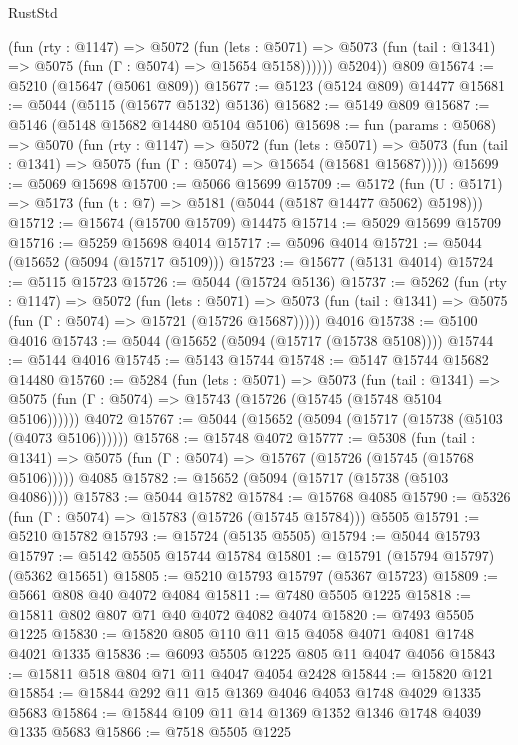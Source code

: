 \begin{lexlean}{RustStd}
\begin{coremodule}
            (fun (rty : @1147) =>
            @5072
              (fun (lets : @5071) =>
              @5073 (fun (tail : @1341) => @5075 (fun (Γ : @5074) => @15654 @5158))))))
        @5204))
    @809
@15674 := @5210 (@15647 (@5061 @809))
@15677 := @5123 (@5124 @809) @14477
@15681 := @5044 (@5115 (@15677 @5132) @5136)
@15682 := @5149 @809
@15687 := @5146 (@5148 @15682 @14480 @5104 @5106)
@15698 := fun (params : @5068) =>
  @5070
    (fun (rty : @1147) =>
    @5072
      (fun (lets : @5071) =>
      @5073 (fun (tail : @1341) => @5075 (fun (Γ : @5074) => @15654 (@15681 @15687)))))
@15699 := @5069 @15698
@15700 := @5066 @15699
@15709 := @5172
    (fun (U : @5171) => @5173 (fun (t : @7) => @5181 (@5044 (@5187 @14477 @5062) @5198)))
@15712 := @15674 (@15700 @15709) @14475
@15714 := @5029 @15699 @15709
@15716 := @5259 @15698 @4014
@15717 := @5096 @4014
@15721 := @5044 (@15652 (@5094 (@15717 @5109)))
@15723 := @15677 (@5131 @4014)
@15724 := @5115 @15723
@15726 := @5044 (@15724 @5136)
@15737 := @5262
    (fun (rty : @1147) =>
    @5072
      (fun (lets : @5071) =>
      @5073 (fun (tail : @1341) => @5075 (fun (Γ : @5074) => @15721 (@15726 @15687)))))
    @4016
@15738 := @5100 @4016
@15743 := @5044 (@15652 (@5094 (@15717 (@15738 @5108))))
@15744 := @5144 @4016
@15745 := @5143 @15744
@15748 := @5147 @15744 @15682 @14480
@15760 := @5284
    (fun (lets : @5071) =>
    @5073
      (fun (tail : @1341) =>
      @5075 (fun (Γ : @5074) => @15743 (@15726 (@15745 (@15748 @5104 @5106))))))
    @4072
@15767 := @5044 (@15652 (@5094 (@15717 (@15738 (@5103 (@4073 @5106))))))
@15768 := @15748 @4072
@15777 := @5308
    (fun (tail : @1341) => @5075 (fun (Γ : @5074) => @15767 (@15726 (@15745 (@15768 @5106)))))
    @4085
@15782 := @15652 (@5094 (@15717 (@15738 (@5103 @4086))))
@15783 := @5044 @15782
@15784 := @15768 @4085
@15790 := @5326 (fun (Γ : @5074) => @15783 (@15726 (@15745 @15784))) @5505
@15791 := @5210 @15782
@15793 := @15724 (@5135 @5505)
@15794 := @5044 @15793
@15797 := @5142 @5505 @15744 @15784
@15801 := @15791 (@15794 @15797) (@5362 @15651)
@15805 := @5210 @15793 @15797 (@5367 @15723)
@15809 := @5661 @808 @40 @4072 @4084
@15811 := @7480 @5505 @1225
@15818 := @15811 @802 @807 @71 @40 @4072 @4082 @4074
@15820 := @7493 @5505 @1225
@15830 := @15820 @805 @110 @11 @15 @4058 @4071 @4081 @1748 @4021 @1335
@15836 := @6093 @5505 @1225 @805 @11 @4047 @4056
@15843 := @15811 @518 @804 @71 @11 @4047 @4054 @2428
@15844 := @15820 @121
@15854 := @15844 @292 @11 @15 @1369 @4046 @4053 @1748 @4029 @1335 @5683
@15864 := @15844 @109 @11 @14 @1369 @1352 @1346 @1748 @4039 @1335 @5683
@15866 := @7518 @5505 @1225

\end{coremodule}
\end{lexlean}
